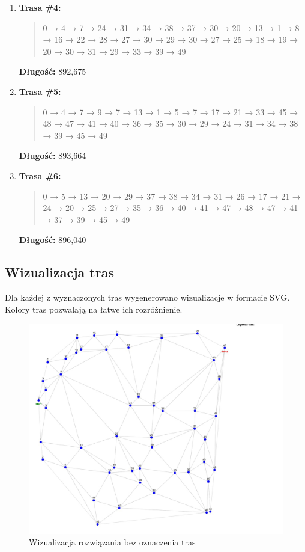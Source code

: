 \documentclass{article}
\begin{document}
\begin{enumerate}
    \item \textbf{Trasa \#4:}
    \begin{quote}
        0 → 4 → 7 → 24 → 31 → 34 → 38 → 37 → 30 → 20 → 13 → 1 → 8 → 16 → 22 → 28 → 27 → 30 → 29 → 30 → 27 → 25 → 18 → 19 → 20 → 30 → 31 → 29 → 33 → 39 → 49
    \end{quote}
    \textbf{Długość:} 892{,}675

    \item \textbf{Trasa \#5:}
    \begin{quote}
        0 → 4 → 7 → 9 → 7 → 13 → 1 → 5 → 7 → 17 → 21 → 33 → 45 → 48 → 47 → 41 → 40 → 36 → 35 → 30 → 29 → 24 → 31 → 34 → 38 → 39 → 45 → 49
    \end{quote}
    \textbf{Długość:} 893{,}664

    \item \textbf{Trasa \#6:}
    \begin{quote}
        0 → 5 → 13 → 20 → 29 → 37 → 38 → 34 → 31 → 26 → 17 → 21 → 24 → 20 → 25 → 27 → 35 → 36 → 40 → 41 → 47 → 48 → 47 → 41 → 37 → 39 → 45 → 49
    \end{quote}
    \textbf{Długość:} 896{,}040
\end{enumerate}

\subsection*{Wizualizacja tras}

Dla każdej z wyznaczonych tras wygenerowano wizualizacje w formacie SVG. Kolory tras pozwalają na łatwe ich rozróżnienie.

\begin{figure}[H]
    \centering
    \includegraphics[width=1\linewidth]{277F47CA-3920-4B86-AFE1-1EB9FF95EBFC.png}
    \caption{Wizualizacja rozwiązania bez oznaczenia tras}
    \label{fig:enter-label}
\end{figure}
\end{document}

